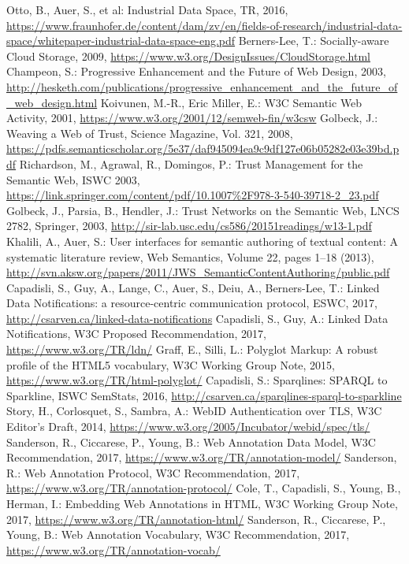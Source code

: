 \documentclass[a4paper]{llncs}
\begin{document}
\begin{thebibliography}{99}
   Otto, B., Auer, S., et al: Industrial Data Space, TR, 2016, \url{https://www.fraunhofer.de/content/dam/zv/en/fields-of-research/industrial-data-space/whitepaper-industrial-data-space-eng.pdf}
   Berners-Lee, T.: Socially-aware Cloud Storage, 2009, \url{https://www.w3.org/DesignIssues/CloudStorage.html}
   Champeon, S.: Progressive Enhancement and the Future of Web Design, 2003, \url{http://hesketh.com/publications/progressive\_enhancement\_and\_the\_future\_of\_web\_design.html}
   Koivunen, M.-R., Eric Miller, E.: W3C Semantic Web Activity, 2001, \url{https://www.w3.org/2001/12/semweb-fin/w3csw}
   Golbeck, J.: Weaving a Web of Trust, Science Magazine, Vol. 321, 2008, \url{https://pdfs.semanticscholar.org/5e37/daf945094ea9c9df127e06b05282e03e39bd.pdf}
   Richardson, M., Agrawal, R., Domingos, P.: Trust Management for the Semantic Web, ISWC 2003, \url{https://link.springer.com/content/pdf/10.1007\%2F978-3-540-39718-2\_23.pdf}
   Golbeck, J., Parsia, B., Hendler, J.: Trust Networks on the Semantic Web, LNCS 2782, Springer, 2003, \url{http://sir-lab.usc.edu/cs586/20151readings/w13-1.pdf}
   Khalili, A., Auer, S.: User interfaces for semantic authoring of textual content: A systematic literature review, Web Semantics, Volume 22, pages 1–18 (2013), \url{http://svn.aksw.org/papers/2011/JWS\_SemanticContentAuthoring/public.pdf}
   Capadisli, S., Guy, A., Lange, C., Auer, S., Deiu, A., Berners-Lee, T.: Linked Data Notifications: a resource-centric communication protocol, ESWC, 2017, \url{http://csarven.ca/linked-data-notifications}
   Capadisli, S., Guy, A.: Linked Data Notifications, W3C Proposed Recommendation, 2017, \url{https://www.w3.org/TR/ldn/}
   Graff, E., Silli, L.: Polyglot Markup: A robust profile of the HTML5 vocabulary, W3C Working Group Note, 2015, \url{https://www.w3.org/TR/html-polyglot/}
   Capadisli, S.: Sparqlines: SPARQL to Sparkline, ISWC SemStats, 2016, \url{http://csarven.ca/sparqlines-sparql-to-sparkline}
   Story, H., Corlosquet, S., Sambra, A.: WebID Authentication over TLS, W3C Editor’s Draft, 2014, \url{https://www.w3.org/2005/Incubator/webid/spec/tls/}
   Sanderson, R., Ciccarese, P., Young, B.: Web Annotation Data Model, W3C Recommendation, 2017, \url{https://www.w3.org/TR/annotation-model/}
   Sanderson, R.: Web Annotation Protocol, W3C Recommendation, 2017, \url{https://www.w3.org/TR/annotation-protocol/}
   Cole, T., Capadisli, S., Young, B., Herman, I.: Embedding Web Annotations in HTML, W3C Working Group Note, 2017, \url{https://www.w3.org/TR/annotation-html/}
   Sanderson, R., Ciccarese, P., Young, B.: Web Annotation Vocabulary, W3C Recommendation, 2017, \url{https://www.w3.org/TR/annotation-vocab/}
\end{thebibliography}
\end{document}
